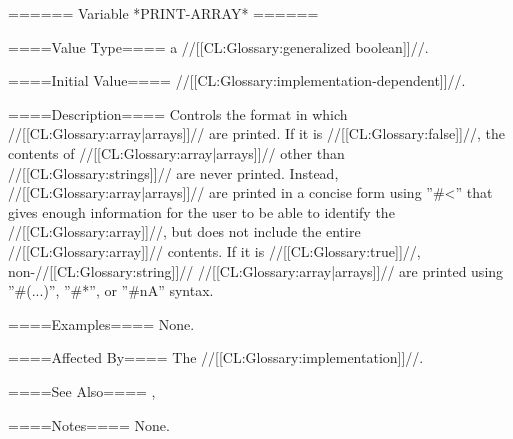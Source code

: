 ====== Variable *PRINT-ARRAY* ======

====Value Type====
a //[[CL:Glossary:generalized boolean]]//.

====Initial Value====
//[[CL:Glossary:implementation-dependent]]//.

====Description====
Controls the format in which //[[CL:Glossary:array|arrays]]// are printed. If it is //[[CL:Glossary:false]]//, the contents of //[[CL:Glossary:array|arrays]]// other than //[[CL:Glossary:strings]]// are never printed. Instead, //[[CL:Glossary:array|arrays]]// are printed in a concise form using ''#<'' that gives enough information for the user to be able to identify the //[[CL:Glossary:array]]//, but does not include the entire //[[CL:Glossary:array]]// contents. If it is //[[CL:Glossary:true]]//, non-//[[CL:Glossary:string]]// //[[CL:Glossary:array|arrays]]// are printed using ''#(...)'', ''#*'', or ''#nA'' syntax.

====Examples====
None.

====Affected By====
The //[[CL:Glossary:implementation]]//.

====See Also====
{\secref\SharpsignLeftParen}, {\secref\SharpsignLeftAngle}

====Notes====
None.

